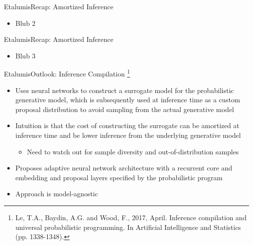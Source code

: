 \documentclass[AERbeamer%
              ,optEnglish%
              ,optBiber%
              ,optBibstyleAlphabetic%
              ,optBeamerClassicFormat%
              ]{AERlatex}%
\begin{document}
\begin{frame}[c]{Etalumis}{Recap: Amortized Inference}
    \centering
    \begin{itemize}
        \item Blub 2
    \end{itemize}
\end{frame}


\begin{frame}[c]{Etalumis}{Recap: Amortized Inference}
    \centering
    \begin{itemize}
        \item Blub 3
    \end{itemize}
\end{frame}


\begin{frame}[c]{Etalumis}{Outlook: Inference Compilation \footnote{Le, T.A., Baydin, A.G. and Wood, F., 2017, April. Inference
                                                                    compilation and universal probabilistic programming. In Artificial
                                                                    Intelligence and Statistics (pp. 1338-1348).}    }
    \centering
    \begin{itemize}
        \item Uses neural networks to construct a surrogate model for the probabilistic generative model, which is subsequently
              used at inference time as a custom proposal distribution to avoid sampling from the actual generative model
        \item Intuition is that the cost of constructing the surrogate can be amortized at inference time and be lower
              inference from the underlying generative model
        \begin{itemize}
            \item Need to watch out for sample diversity and out-of-distribution samples 
        \end{itemize}
        \item Proposes adaptive neural network architecture with a recurrent core and embedding and proposal layers specified
              by the probabilistic program
        \item Approach is model-agnostic
    \end{itemize}
\end{frame}
\end{document}
